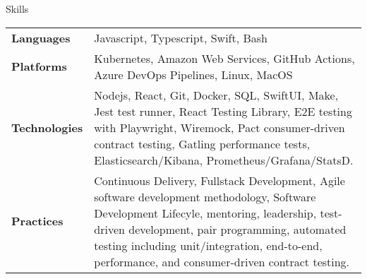 \begin{section}{Skills}
  \begin{tabularx}{\linewidth}{@{}l X@{}}
    \textbf{Languages} &\small{Javascript, Typescript, Swift, Bash} \\
    \textbf{Platforms} &\small{Kubernetes, Amazon Web Services, GitHub Actions, Azure DevOps Pipelines, Linux, MacOS} \\
    \textbf{Technologies} &\small{Nodejs, React, Git, Docker, SQL, SwiftUI, Make, Jest test runner, React Testing Library, E2E testing with Playwright, Wiremock, Pact consumer-driven contract testing, Gatling performance tests, Elasticsearch/Kibana, Prometheus/Grafana/StatsD.} \\
    \textbf{Practices} &\small{Continuous Delivery, Fullstack Development, Agile software development methodology, Software Development Lifecyle, mentoring, leadership, test-driven development, pair programming, automated testing including unit/integration, end-to-end, performance, and consumer-driven contract testing.} \\
  \end{tabularx}
\end{section}
